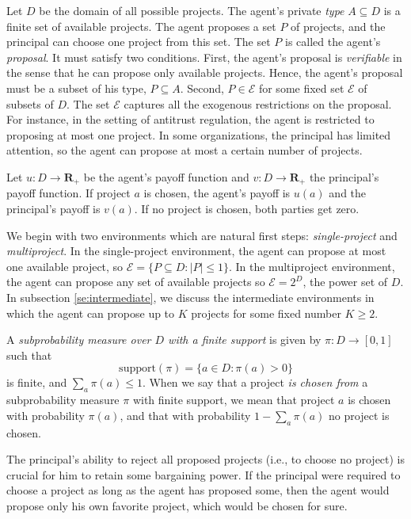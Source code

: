 \documentclass[12pt,english]{article}
\newcommand{\cale}{\mathcal E}
\newcommand{\support}{\text{support}}
\newcommand{\bfr}{\mathbf{R}}
\theoremstyle{remark}
\theoremstyle{plain}
\theoremstyle{definition}
\begin{document}
Let $D$ be the domain of all possible projects. The agent's private \emph{type} $A \subseteq D$ is a finite set of available projects. The agent proposes a set $P$ of projects, and the principal can choose one project from this set. The set $P$ is called the agent's \emph{proposal}. It must satisfy two conditions. First, the agent's proposal is \textit{verifiable} in the sense that he can propose only available projects. Hence, the agent's proposal must be a subset of his type, $P\subseteq A$. %
Second, $P\in \cale $ for some fixed set $\cale$ of subsets of $D$. The set $\cale$ captures all the exogenous restrictions on the proposal. For instance, in the setting of antitrust regulation, the agent is restricted to proposing at most one project. In some organizations, the principal has limited attention, so the agent can propose at most a certain number of projects.  

Let $u:D\to \bfr_+$ be the agent's payoff function and $v:D\to \bfr_+$ the principal's payoff function. If project $a$ is chosen, the agent's payoff is $u(a)$ and the principal's payoff is $v(a)$. If no project is chosen, both parties get zero. 

We begin with two environments which are natural first steps: \emph{single-project} and \emph{multiproject}. In the single-project environment, the agent can propose at most one available project, so $\cale=\{P\subseteq D: |P|\leqslant 1 \}$. In the multiproject environment, the agent can propose any set of available projects so $\cale=2^D$, the power set of $D$. In subsection \ref{se:intermediate}, we discuss the intermediate environments in which the agent can propose up to $K$ projects for some fixed number $K\geqslant 2$.  



A \emph{subprobability measure over $D$ with a finite support} is given by $\pi:D \to [0,1]$ such that \[\support(\pi)=\{a\in D:\pi(a)> 0\}\] is finite, and $\sum_{a}\pi(a)\leqslant 1$. When we say that a project \emph{is chosen from} a subprobability measure $\pi$ with finite support, we mean that project $a$ is chosen with probability $\pi(a)$, and that with probability $1-\sum_{a}\pi(a)$ no project is chosen. 

The principal's ability to reject all proposed projects (i.e., to choose no project) is crucial for him to retain some bargaining power. If the principal were required to choose a project as long as the agent has proposed some, then the agent would propose only his own favorite project, which would be chosen for sure. 
\end{document}
